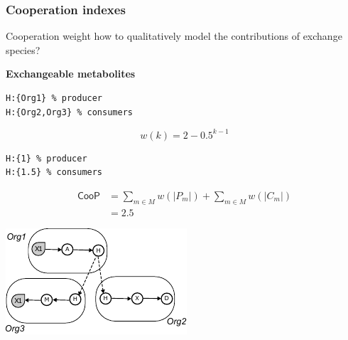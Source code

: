 \documentclass[8pt,usenames,dvipsnames]{beamer}
\begin{document}
\begin{frame}[fragile]
\frametitle{Cooperation  indexes}


\begin{minipage}{0.5\textwidth}
\begin{block}{Cooperation weight}
how to qualitatively model the contributions of exchange species?
\end{block}
\textbf{Exchangeable metabolites}\\
\begin{lstlisting}[mathescape=True]
H:{Org1} % producer
H:{Org2,Org3} % consumers
\end{lstlisting}


\[
w(k) = 2-{0.5^{k-1}}
\]


\begin{lstlisting}[mathescape=True]
H:{1} % producer
H:{1.5} % consumers
\end{lstlisting}
\[
\begin{split}
    \textsf{CooP} &= \sum_{m\in M} w(|P_m|) + \sum_{m\in M} w(|C_m|)\\
      &=  2.5
\end{split}
\]


\end{minipage}%
\hspace{0.5cm}
\hfill
\begin{minipage}{0.4\textwidth}
\includegraphics[width=\textwidth]{figures/exchanged.pdf}
\end{minipage}
\end{frame}
\end{document}
